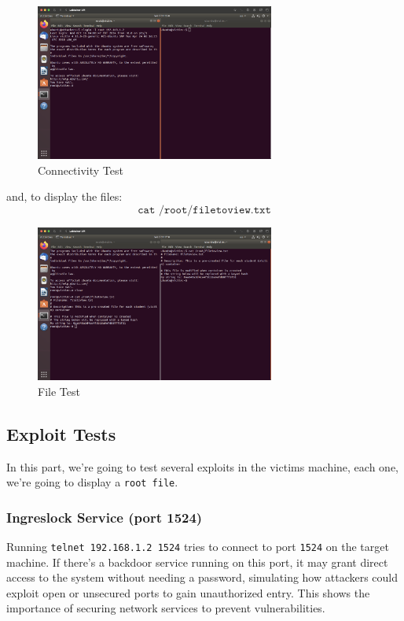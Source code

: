 \documentclass[a4paper,11pt]{article} %
\begin{document}
\begin{figure}[h!]
    \centering
    \includegraphics[width=0.7\textwidth]{images/04.png}
    \caption{Connectivity Test}
\end{figure}

and, to display the files:
\[\texttt{cat /root/filetoview.txt}\]

\begin{figure}[h!]
    \centering
    \includegraphics[width=0.7\textwidth]{images/05.png}
    \caption{File Test}
\end{figure}

\subsection{Exploit Tests}
In this part, we're going to test several exploits in the victims machine, each one, we're going to display a \texttt{root file}.

\subsubsection{Ingreslock Service (port 1524)}
Running \texttt{telnet 192.168.1.2 1524} tries to connect to port \texttt{1524} on the target machine. If there’s a backdoor service running on this port, it may grant direct access to the system without needing a password, simulating how attackers could exploit open or unsecured ports to gain unauthorized entry. This shows the importance of securing network services to prevent vulnerabilities.
\end{document}
